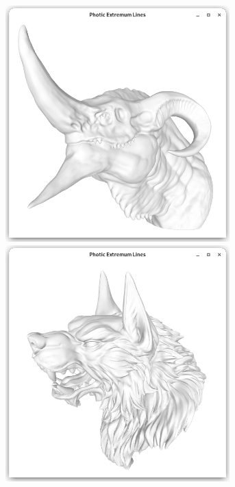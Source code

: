 \documentclass[9pt,fleqn,twoside,twocolumn]{stdglobal}
\begin{document}
\begin{figure}
\begin{subfigure}[t]{0.19\textwidth}
        \includegraphics[width=0.95\textwidth,trim={15px 15 15 50},clip]{images/results/dragon-head.png}
        \includegraphics[width=0.95\textwidth,trim={15px 15 15 50},clip]{images/results/werewolf.png}

\end{subfigure}
\end{figure}
\end{document}
